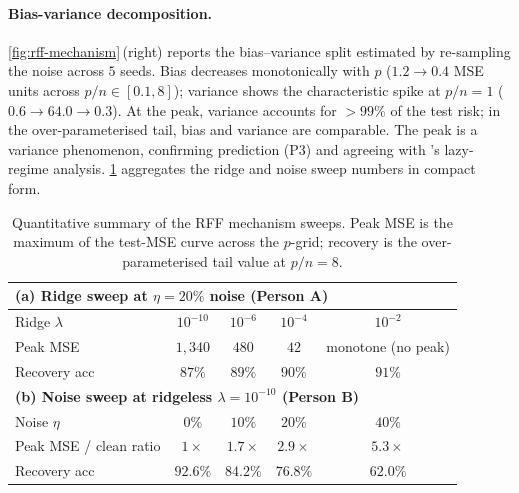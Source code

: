 \documentclass{article}
\begin{document}
\paragraph{Bias-variance decomposition.} \cref{fig:rff-mechanism}\,(right) reports the bias--variance split estimated by re-sampling the noise across $5$ seeds. Bias decreases monotonically with $p$ ($1.2 \to 0.4$ MSE units across $p/n \in [0.1, 8]$); variance shows the characteristic spike at $p/n=1$ ($0.6 \to 64.0 \to 0.3$). At the peak, variance accounts for $> 99\%$ of the test risk; in the over-parameterised tail, bias and variance are comparable. The peak is a variance phenomenon, confirming prediction (P3) and agreeing with \citet{dascoli2020double}'s lazy-regime analysis. \cref{tab:rff-mechanism} aggregates the ridge and noise sweep numbers in compact form.

\begin{table}[t]
  \centering
  \small
  \caption{Quantitative summary of the RFF mechanism sweeps. Peak MSE is the maximum of the test-MSE curve across the $p$-grid; recovery is the over-parameterised tail value at $p/n=8$.}
  \label{tab:rff-mechanism}
  \begin{tabular}{lcccc}
    \toprule
    \multicolumn{5}{l}{\textbf{(a) Ridge sweep at $\eta = 20\%$ noise (Person A)}} \\
    \midrule
    Ridge $\lambda$ & $10^{-10}$ & $10^{-6}$ & $10^{-4}$ & $10^{-2}$ \\
    Peak MSE        & $1{,}340$  & $480$     & $42$      & monotone (no peak) \\
    Recovery acc    & $87\%$     & $89\%$    & $90\%$    & $91\%$ \\
    \midrule
    \multicolumn{5}{l}{\textbf{(b) Noise sweep at ridgeless $\lambda = 10^{-10}$ (Person B)}} \\
    \midrule
    Noise $\eta$    & $0\%$     & $10\%$    & $20\%$    & $40\%$ \\
    Peak MSE / clean ratio & $1\times$ & $1.7\times$ & $2.9\times$ & $5.3\times$ \\
    Recovery acc    & $92.6\%$  & $84.2\%$  & $76.8\%$  & $62.0\%$ \\
    \bottomrule
  \end{tabular}
\end{table}
\end{document}
